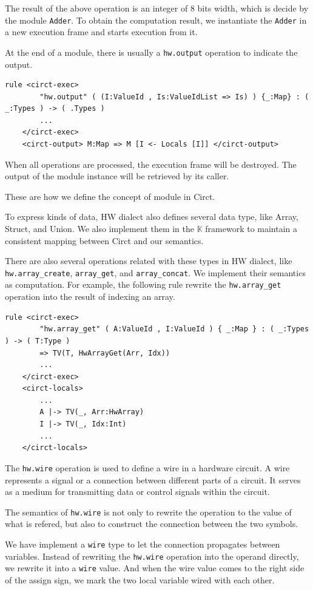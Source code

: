 The result of the above operation is an integer of 8 bits width, which is decide by the module \verb|Adder|. To obtain the computation result, we instantiate the \verb|Adder| in a new execution frame and starts execution from it.

At the end of a module, there is usually a \verb|hw.output| operation to indicate the output.
\begin{lstlisting}
rule <circt-exec> 
        "hw.output" ( (I:ValueId , Is:ValueIdList => Is) ) {_:Map} : ( _:Types ) -> ( .Types )
        ...
    </circt-exec>
    <circt-output> M:Map => M [I <- Locals [I]] </circt-output>
\end{lstlisting}

When all operations are processed, the execution frame will be destroyed. The output of the module instance will be retrieved by its caller.

These are how we define the concept of module in Circt.

To express kinds of data, HW dialect also defines several data type, like Array, Struct, and Union. We also implement them in the $\mathbb{K}$ framework to maintain a consistent mapping between Circt and our semantics.

There are also several operations related with these types in HW dialect, like \verb|hw.array_create|, \verb|array_get|, and \verb|array_concat|. We implement their semantics as computation. For example, the following rule rewrite the \verb|hw.array_get| operation into the result of indexing an array.
\begin{lstlisting}
rule <circt-exec>
        "hw.array_get" ( A:ValueId , I:ValueId ) { _:Map } : ( _:Types ) -> ( T:Type )
        => TV(T, HwArrayGet(Arr, Idx))
        ...
    </circt-exec>
    <circt-locals>
        ...
        A |-> TV(_, Arr:HwArray)
        I |-> TV(_, Idx:Int)
        ...
    </circt-locals>
\end{lstlisting}

The \verb|hw.wire| operation is used to define a wire in a hardware circuit. A wire represents a signal or a connection between different parts of a circuit. It serves as a medium for transmitting data or control signals within the circuit.

The semantics of \verb|hw.wire| is not only to rewrite the operation to the value of what is refered, but also to construct the connection between the two symbols.

We have implement a \verb|wire| type to let the connection propagates between variables. Instead of rewriting the \verb|hw.wire| operation into the operand directly, we rewrite it into a \verb|wire| value. And when the wire value comes to the right side of the assign sign, we mark the two local variable wired with each other.

